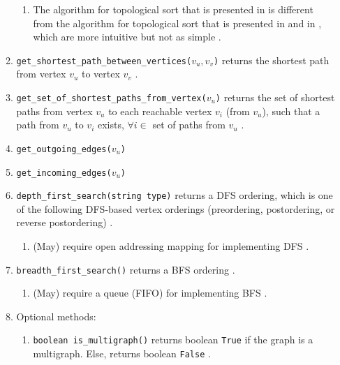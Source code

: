 \begin{enumerate}
\begin{enumerate}
\begin{enumerate}
		\item The algorithm for topological sort that is presented in \cite[\S22]{Cormen2009} is different \cite[\S5, pp. 89]{Cormen2013} from the algorithm for topological sort that is presented in \cite[\S5, pp. 75--78, 80]{Cormen2013} and in \cite{Knuth1997}, which are more intuitive but not as simple \cite[\S5, pp. 89]{Cormen2013}.
		\end{enumerate}
	\item {\tt get\_shortest\_path\_between\_vertices($v_{u}, v_{v}$)} returns the shortest path from vertex $v_{u}$ to vertex $v_{v}$ \cite[\S52.4, pp. 850]{Goldman2008}.
	\item {\tt get\_set\_of\_shortest\_paths\_from\_vertex($v_{u}$)} returns the set of shortest paths from vertex $v_{u}$ to each reachable vertex $v_{i}$ (from $v_{u}$), such that a path from $v_{u}$ to $v_{i}$ exists, $\forall i \in$ set of paths from $v_{u}$ \cite[\S52.4, pp. 850]{Goldman2008}.
	\item {\tt get\_outgoing\_edges($v_{u}$)} \cite[\S14.1.1, pp. 626]{Goodrich2013} \cite[\S52.5, pp. 851]{Goldman2008}
	\item {\tt get\_incoming\_edges($v_{u}$)} \cite[\S14.1.1, pp. 626]{Goodrich2013} \cite[\S52.5, pp. 851]{Goldman2008}
	\item {\tt depth\_first\_search(string type)} returns a DFS ordering, which is one of the following DFS-based vertex orderings (preordering, postordering, or reverse postordering) \cite{WikipediaContributors2018a51}.\vspace{-0.2cm}
		\begin{enumerate} \itemsep -2pt
		\item (May) require open addressing mapping for implementing DFS \cite[\S53, pp. 857]{Goldman2008}.
		\end{enumerate}
	\item {\tt breadth\_first\_search()} returns a BFS ordering \cite{WikipediaContributors2019}. \vspace{-0.2cm}
		\begin{enumerate} \itemsep -2pt
		\item (May) require a queue (FIFO) for implementing BFS \cite[\S53, pp. 857]{Goldman2008}.
		\end{enumerate}
	\item Optional methods: \vspace{-0.2cm}
		\begin{enumerate} %
		\item {\tt boolean is\_multigraph()} returns boolean {\tt True} if the graph is a multigraph. Else, returns boolean {\tt False} \cite[\S52.4, pp. 849]{Goldman2008}. 

\end{enumerate}
\end{enumerate}
\end{enumerate}
